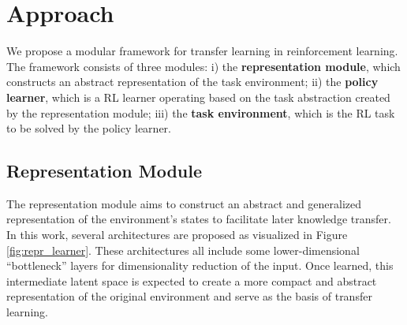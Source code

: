 
\section{Approach}
\label{sec:approach}
We propose a modular framework for transfer learning in reinforcement learning. 
The framework consists of three modules: 
i) the \textbf{representation module}, which constructs an abstract representation of the task environment;
ii) the \textbf{policy learner}, which is a RL learner operating based on the task abstraction created by the representation module;
iii) the \textbf{task environment}, which is the RL task to be solved by the policy learner.

\subsection{Representation Module}
The representation module aims to construct an abstract and generalized representation of the environment's states to facilitate later knowledge transfer.
In this work, several architectures are proposed as visualized in Figure \ref{fig:repr_learner}.
These architectures all include some lower-dimensional ``bottleneck'' layers for dimensionality reduction of the input.
Once learned, this intermediate latent space is expected to create a more compact and abstract representation of the original environment and serve as the basis of transfer learning. 


